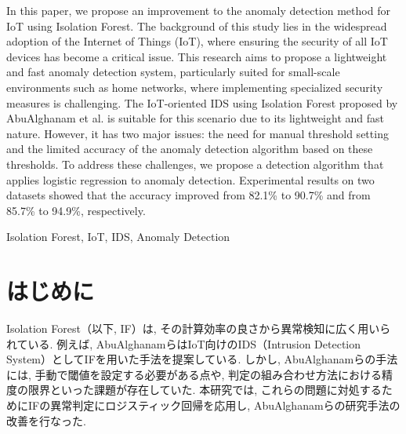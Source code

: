 \documentclass{css}
\begin{document}
\begin{eabstract}
    In this paper, we propose an improvement to the anomaly detection method for IoT using Isolation Forest. The background of this study lies in the widespread adoption of the Internet of Things (IoT), where ensuring the security of all IoT devices has become a critical issue. This research aims to propose a lightweight and fast anomaly detection system, particularly suited for small-scale environments such as home networks, where implementing specialized security measures is challenging. The IoT-oriented IDS using Isolation Forest proposed by AbuAlghanam et al. is suitable for this scenario due to its lightweight and fast nature. However, it has two major issues: the need for manual threshold setting and the limited accuracy of the anomaly detection algorithm based on these thresholds. To address these challenges, we propose a detection algorithm that applies logistic regression to anomaly detection. Experimental results on two datasets showed that the accuracy improved from 82.1\% to 90.7\% and from 85.7\% to 94.9\%, respectively.

\end{eabstract}


\begin{ekeyword}
Isolation Forest, IoT, IDS, Anomaly Detection
\end{ekeyword}


\maketitle

\section{はじめに}
Isolation Forest（以下, IF）は, その計算効率の良さから異常検知に広く用いられている. 例えば, AbuAlghanamらはIoT向けのIDS（Intrusion Detection System）としてIFを用いた手法を提案している\cite{AbuAlghanam2023-sx}. しかし, AbuAlghanamらの手法には, 手動で閾値を設定する必要がある点や, 判定の組み合わせ方法における精度の限界といった課題が存在していた. 本研究では, これらの問題に対処するためにIFの異常判定にロジスティック回帰を応用し, AbuAlghanamらの研究手法の改善を行なった. 
\end{document}
